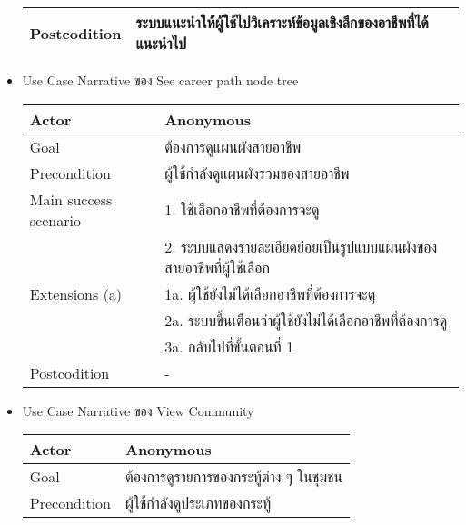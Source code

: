 \begin{itemize}
\begin{table}[!h]
\begin{tabular}{|l|l|}
                  Postcodition          & ระบบแนะนำให้ผู้ใช้ไปวิเคราะห์ข้อมูลเชิงลึกของอาชีพที่ได้แนะนำไป \\ \hline
              \end{tabular}
          \end{table}
    \item Use Case Narrative ของ See career path node tree
          \begin{table}[!h]
              \begin{tabular}{|l|l|} \hline
                  Actor                 & Anonymous                                              \\ \hline
                  Goal                  & ต้องการดูแผนผังสายอาชีพ                                    \\ \hline
                  Precondition          & ผู้ใช้กำลังดูแผนผังรวมของสายอาชีพ                              \\ \hline
                  Main success scenario & 1. ใช้เลือกอาชีพที่ต้องการจะดู                                \\
                                        & 2. ระบบแสดงรายละเอียดย่อยเป็นรูปแบบแผนผังของสายอาชีพที่ผู้ใช้เลือก \\ \hline
                  Extensions (a)        & 1a. ผู้ใช้ยังไม่ได้เลือกอาชีพที่ต้องการจะดู                        \\
                                        & 2a. ระบบขึ้นเตือนว่าผู้ใช้ยังไม่ได้เลือกอาชีพที่ต้องการดู              \\
                                        & 3a. กลับไปที่ขั้นตอนที่ 1                                     \\ \hline
                  Postcodition          & -                                                      \\ \hline
              \end{tabular}
          \end{table}
    \item Use Case Narrative ของ View Community
          \begin{table}[!h]
              \begin{tabular}{|l|l|} \hline
                  Actor                 & Anonymous                              \\ \hline
                  Goal                  & ต้องการดูรายการของกระทู้ต่าง ๆ ในชุมชน       \\ \hline
                  Precondition          & ผู้ใช้กำลังดูประเภทของกระทู้                   \\ \hline

\end{tabular}
\end{table}
\end{itemize}
